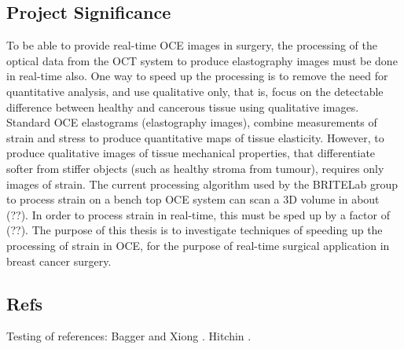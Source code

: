 \subsection{Project Significance}
To be able to provide real-time OCE images in surgery, the processing of the optical data from the OCT system to produce elastography images must be done in real-time also. One way to speed up the processing is to remove the need for quantitative analysis, and use qualitative only, that is, focus on the detectable difference between healthy and cancerous tissue using qualitative images. Standard OCE elastograms (elastography images), combine measurements of strain and stress to produce quantitative maps of tissue elasticity. However, to produce qualitative images of tissue mechanical properties, that differentiate softer from stiffer objects (such as healthy stroma from tumour), requires only images of strain. 
The current processing algorithm used by the BRITELab group to process strain on a bench top OCE system can scan a 3D volume in about (??). In order to process strain in real-time, this must be sped up by a factor of (??). The purpose of this thesis is to investigate techniques of speeding up the processing of strain in OCE, for the purpose of real-time surgical application in breast cancer surgery.

\subsection{Refs}
Testing of references: 
Bagger and Xiong \citep{baggerxiong}. Hitchin \cite{hitchin}.

